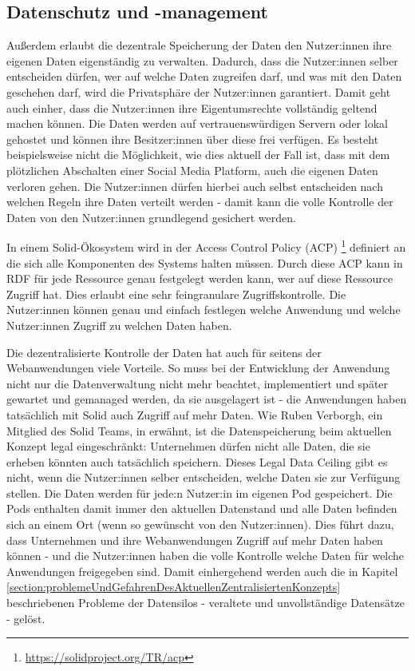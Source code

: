 \documentclass[acmtog]{acmart}
\begin{document}
\subsection{Datenschutz und -management}

Außerdem erlaubt die dezentrale Speicherung der Daten den Nutzer:innen ihre eigenen Daten eigenständig zu verwalten. Dadurch, dass die Nutzer:innen selber entscheiden dürfen, wer auf welche Daten zugreifen darf, und was mit den Daten geschehen darf, wird die Privatsphäre der Nutzer:innen garantiert. Damit geht auch einher, dass die Nutzer:innen ihre Eigentumsrechte vollständig geltend machen können. Die Daten werden auf vertrauenswürdigen Servern oder lokal gehostet und können ihre Besitzer:innen über diese frei verfügen. Es besteht beispielsweise nicht die Möglichkeit, wie dies aktuell der Fall ist, dass mit dem plötzlichen Abschalten einer Social Media Platform, auch die eigenen Daten verloren gehen. Die Nutzer:innen dürfen hierbei auch selbst entscheiden nach welchen Regeln ihre Daten verteilt werden - damit kann die volle Kontrolle der Daten von den Nutzer:innen grundlegend gesichert werden. \cite{yeung2023decentralization}

In einem Solid-Ökosystem wird in der Access Control Policy (ACP) \footnote{\url{https://solidproject.org/TR/acp}} definiert an die sich alle Komponenten des Systems halten müssen. Durch diese ACP kann in RDF für jede Ressource genau festgelegt werden kann, wer auf diese Ressource Zugriff hat. Dies erlaubt eine sehr feingranulare Zugriffskontrolle. Die Nutzer:innen können genau und einfach festlegen welche Anwendung und welche Nutzer:innen Zugriff zu welchen Daten haben.

Die dezentralisierte Kontrolle der Daten hat auch für seitens der Webanwendungen viele Vorteile. So muss bei der Entwicklung der Anwendung nicht nur die Datenverwaltung nicht mehr beachtet, implementiert und später gewartet und gemanaged werden, da sie ausgelagert ist - die Anwendungen haben tatsächlich mit Solid auch Zugriff auf mehr Daten. Wie Ruben Verborgh, ein Mitglied des Solid Teams, in \cite{MarcoNeumann.2021} erwähnt, ist die Datenspeicherung beim aktuellen Konzept legal eingeschränkt: Unternehmen dürfen nicht alle Daten, die sie erheben könnten auch tatsächlich speichern. Dieses Legal Data Ceiling gibt es nicht, wenn die Nutzer:innen selber entscheiden, welche Daten sie zur Verfügung stellen. Die Daten werden für jede:n Nutzer:in im eigenen Pod gespeichert. Die Pods enthalten damit immer den aktuellen Datenstand und alle Daten befinden sich an einem Ort (wenn so gewünscht von den Nutzer:innen). Dies führt dazu, dass Unternehmen und ihre Webanwendungen Zugriff auf mehr Daten haben können - und die Nutzer:innen haben die volle Kontrolle welche Daten für welche Anwendungen freigegeben sind. Damit einhergehend werden auch die in Kapitel \ref{section:problemeUndGefahrenDesAktuellenZentralisiertenKonzepts} beschriebenen Probleme der Datensilos - veraltete und unvollständige Datensätze - gelöst.
\end{document}
